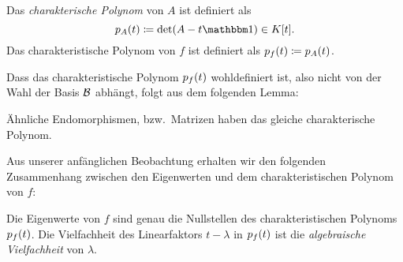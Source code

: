 \begin{definition}
  Das \emph{charakterische Polynom} von $A$ ist definiert als
  \[
              \charpol{A}(t)
    \coloneqq \det ( A - t \Id )
    \in       K[t].
  \]
  Das charakteristische Polynom von $f$ ist definiert als $p_{f}(t) \coloneqq p_{A}(t)$.
\end{definition}

Dass das charakteristische Polynom $p_{f}(t)$ wohldefiniert ist, also nicht von der Wahl der Basis $\mathcal{B}$ abhängt, folgt aus dem folgenden Lemma:

\begin{lemma}
  Ähnliche Endomorphismen, bzw.\ Matrizen haben das gleiche charakterische Polynom.
\end{lemma}

Aus unserer anfänglichen Beobachtung erhalten wir den folgenden Zusammenhang zwischen den Eigenwerten und dem charakteristischen Polynom von $f$:

\begin{proposition}
  Die Eigenwerte von $f$ sind genau die Nullstellen des charakteristischen Polynoms $p_{f}(t)$.
  Die Vielfachheit des Linearfaktors $t - \lambda$ in $p_{f}(t)$ ist die \emph{algebraische Vielfachheit} von $\lambda$.
\end{proposition}

